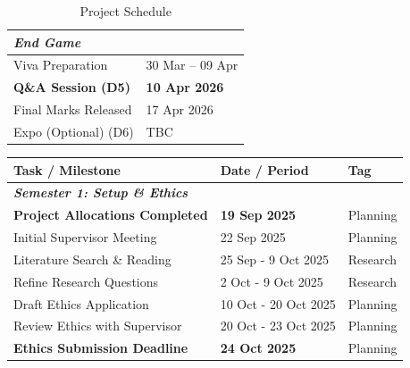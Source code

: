 \documentclass[12pt,nonacm,acmlarge,titlepage,screen]{acmart}
\begin{document}
\begin{table}[htbp]
\begin{tabularx}{\textwidth}{| X | l |}
        \multicolumn{2}{|l|}{\textit{\textbf{End Game}}} \\
        \hline
        Viva Preparation & 30 Mar -- 09 Apr \\
        \hline
        \textbf{Q\&A Session (D5)} & \textbf{10 Apr 2026} \\
        \hline
        Final Marks Released & 17 Apr 2026 \\
        \hline
        Expo (Optional) (D6) & TBC \\
        \hline
    \end{tabularx}
    \caption{Project Schedule}
    \label{tab:schedule}
\end{table}


\begin{table}[htbp]
    \centering
    \small
    \renewcommand{\arraystretch}{1.3}
    
    \begin{tabularx}{\textwidth}{| X | l | l |}
        \hline
        \textbf{Task / Milestone} & \textbf{Date / Period} & \textbf{Tag} \\
        \hline
        
        \multicolumn{3}{|l|}{\textit{\textbf{Semester 1: Setup \& Ethics}}} \\
        \hline
        \textbf{Project Allocations Completed} & \textbf{19 Sep 2025} & Planning \\
        \hline
        Initial Supervisor Meeting & 22 Sep 2025 & Planning \\
        \hline
        Literature Search \& Reading & 25 Sep - 9 Oct 2025 & Research \\
        \hline
        Refine Research Questions & 2 Oct - 9 Oct 2025 & Research \\
        \hline
        Draft Ethics Application & 10 Oct - 20 Oct 2025 & Planning \\
        \hline
        Review Ethics with Supervisor & 20 Oct - 23 Oct 2025 & Planning \\
        \hline
        \textbf{Ethics Submission Deadline} & \textbf{24 Oct 2025} & Planning \\
        \hline
        

\end{tabularx}
\end{table}
\end{document}
